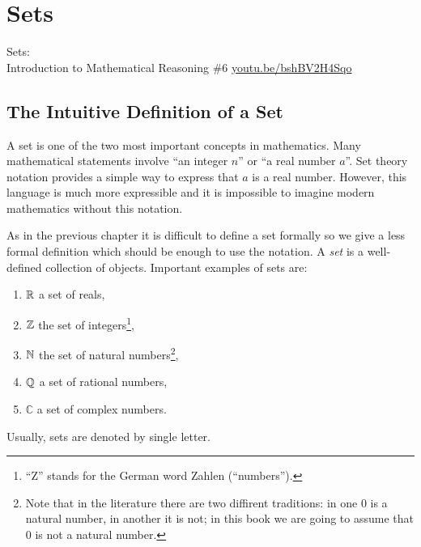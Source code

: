 \chapter{Sets}
\begin{marginfigure}
  {\scriptsize Sets:\\\noindent
  Introduction to Mathematical Reasoning \#6}
  \vskip 0.25cm
  \noindent
  \vskip 0.25cm
  \noindent
  \url{youtu.be/bshBV2H4Sqo}
\end{marginfigure}
\section{The Intuitive Definition of a Set}
A set is one of the two most important concepts in mathematics. Many mathematical
statements involve ``an integer $n$'' or ``a real number $a$''. Set theory
notation provides a simple way to express that $a$ is a real number. However,
this language is much more expressible and it is impossible to imagine modern
mathematics without this notation.

As in the previous chapter it is difficult to define a set formally so we give
a less formal definition which should be enough to use the notation.
A \textit{set} is a well-defined collection of objects. Important examples of
sets are:
\begin{enumerate}
  \item $\mathbb{R}$ a set of reals,
  \item $\mathbb{Z}$ the set of integers\footnote{``Z'' stands for the German word
    Zahlen (``numbers'').},
  \item $\mathbb{N}$ the set of natural numbers\footnote{Note that in the literature
      there are two diffirent traditions: in one $0$ is a natural number, in
      another it is not; in this book we are going to assume that $0$ is not a
      natural number.
    },
  \item $\mathbb{Q}$ a set of rational numbers,
  \item $\mathbb{C}$ a set of complex numbers.
\end{enumerate}
Usually, sets are denoted by single letter.

